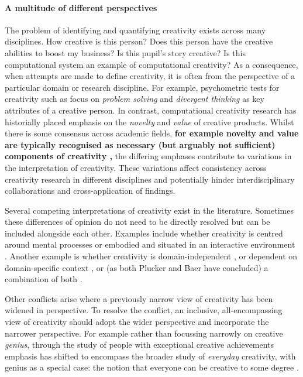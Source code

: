 \documentclass[10pt,letterpaper]{article}
\begin{document}
\paragraph{A multitude of different perspectives} \label{perspectives}

The problem of identifying and quantifying creativity exists across many disciplines. How creative is this person? Does this person have the creative abilities to boost my business? Is this pupil's story creative? Is this computational system an example of computational creativity? As a consequence, when attempts are made to define creativity, it is often from the perspective of a particular domain or research discipline. For example, psychometric tests for creativity such as \cite{guilford50,torrance74} focus on {\em problem solving} and {\em divergent thinking} as key attributes of a creative person. In contrast, computational creativity research \cite[for example]{pease01,wiggins06ngc,peinado06ngc,ritchie07} has historially placed emphasis on the {\em novelty} and {\em value} of creative products. Whilst there is some consensus across academic fields, \textbf{for example novelty and value are typically recognised as necessary (but arguably not sufficient) components of creativity \cite{mayer99},} the differing emphases contribute to variations in the interpretation of creativity. These variations affect consistency across creativity research in different disciplines and potentially hinder interdisciplinary collaborations and cross-application of findings.

Several competing interpretations of creativity exist in the literature. Sometimes these differences of opinion do not need to be directly resolved but can be included alongside each other. Examples include whether creativity is centred around mental processes \cite{boden04,dietrich10} or embodied and situated in an interactive environment \cite{mccormack07,sosa09}. Another example is whether creativity is domain-independent \cite{plucker98}, or dependent on domain-specific context \cite{baer98}, or (as both Plucker and Baer have concluded) a combination of both \cite{plucker04,baer10}. 

Other conflicts arise where a previously narrow view of creativity has been widened in perspective. To resolve the conflict, an inclusive, all-encompassing view of creativity should adopt the wider perspective and incorporate the narrower perspective. For example rather than focussing narrowly on creative {\em genius}, through the study of people with exceptional creative achievements \cite[for example]{poincare29,hadamard45} emphasis has shifted to encompass the broader study of {\em everyday} creativity, with genius as a special case: the notion that everyone can be creative to some degree \cite{weisberg88,bryankinns09}.
\end{document}
